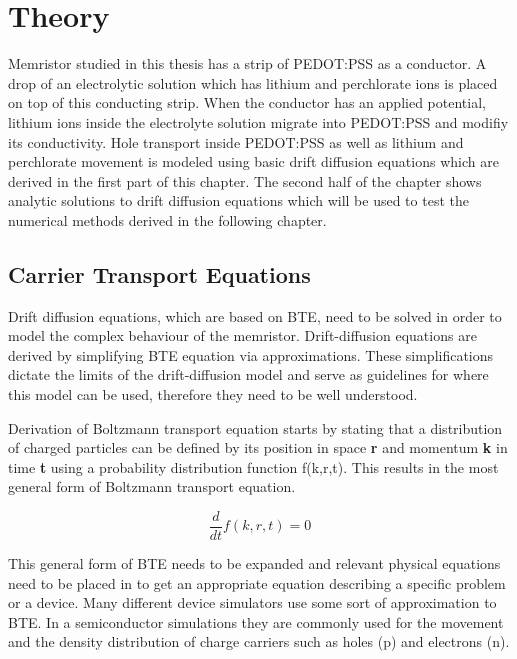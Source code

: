 
\chapter{Theory} %

\label{Chapter2} %

\begin{doublespace}
Memristor studied in this thesis has a strip of PEDOT:PSS as a conductor. A drop of an electrolytic solution which has lithium and perchlorate ions is placed on top of this conducting strip. When the conductor has an applied potential, lithium ions inside the electrolyte solution migrate into PEDOT:PSS and modifiy its conductivity. Hole transport inside PEDOT:PSS as well as lithium and perchlorate movement is modeled using basic drift diffusion equations which are derived in the first part of this chapter. The second half of the chapter shows analytic solutions to drift diffusion equations which will be used to test the numerical methods derived in the following chapter.


\section{Carrier Transport Equations}
Drift diffusion equations, which are based on BTE, need to be solved in order to model the complex behaviour of the memristor. Drift-diffusion equations are derived by simplifying BTE equation via approximations. These simplifications dictate the limits of the drift-diffusion model and serve as guidelines for where this model can be used, therefore they need to be well understood.

Derivation of Boltzmann transport equation starts by stating that a distribution of charged particles can be defined by its position in space \textbf{r} and momentum \textbf{k} in time \textbf{t} using a probability distribution function f(k,r,t). This results in the most general form of Boltzmann transport equation.

\begin{equation}
\frac{d }{dt}f(k,r,t)=0
\end{equation}

This general form of BTE needs to be expanded and relevant physical equations need to be placed in to get an appropriate equation describing a specific problem or a device. 
Many different device simulators use some sort of approximation to BTE. In a semiconductor simulations they are commonly used for the movement and the density distribution of charge carriers such as holes (p) and electrons (n). 


\end{doublespace}
